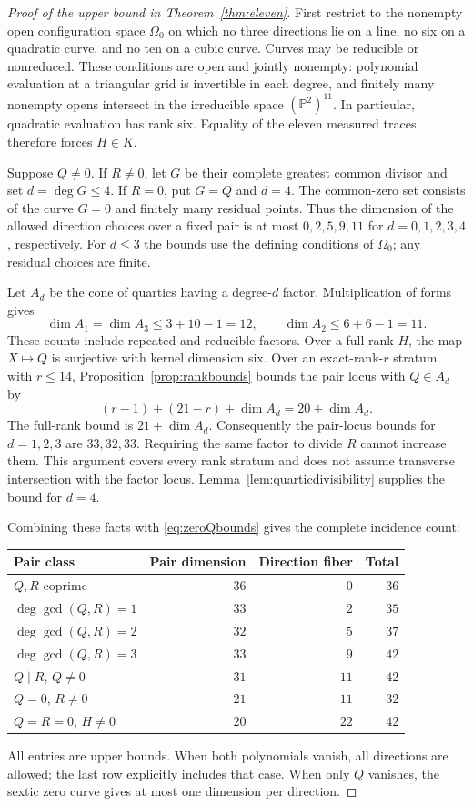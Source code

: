 \documentclass[11pt]{amsart}
\theoremstyle{remark}
\newcommand{\PP}{\mathbb P}
\begin{document}
\begin{proof}[Proof of the upper bound in Theorem~\ref{thm:eleven}]
First restrict to the nonempty open configuration space $\Omega_0$ on which no three directions lie on a line, no six on a quadratic curve, and no ten on a cubic curve. Curves may be reducible or nonreduced. These conditions are open and jointly nonempty: polynomial evaluation at a triangular grid is invertible in each degree, and finitely many nonempty opens intersect in the irreducible space $(\PP^2)^{11}$. In particular, quadratic evaluation has rank six. Equality of the eleven measured traces therefore forces $H\in K$.

Suppose $Q\ne0$. If $R\ne0$, let $G$ be their complete greatest common divisor and set $d=\deg G\leq4$. If $R=0$, put $G=Q$ and $d=4$. The common-zero set consists of the curve $G=0$ and finitely many residual points. Thus the dimension of the allowed direction choices over a fixed pair is at most $0,2,5,9,11$ for $d=0,1,2,3,4$, respectively. For $d\leq3$ the bounds use the defining conditions of $\Omega_0$; any residual choices are finite.

Let $A_d$ be the cone of quartics having a degree-$d$ factor. Multiplication of forms gives
\[
 \dim A_1=\dim A_3\leq3+10-1=12,
 \qquad \dim A_2\leq6+6-1=11.
\]
These counts include repeated and reducible factors. Over a full-rank $H$, the map $X\mapsto Q$ is surjective with kernel dimension six. Over an exact-rank-$r$ stratum with $r\leq14$, Proposition~\ref{prop:rankbounds} bounds the pair locus with $Q\in A_d$ by
\[
 (r-1)+(21-r)+\dim A_d=20+\dim A_d.
\]
The full-rank bound is $21+\dim A_d$. Consequently the pair-locus bounds for $d=1,2,3$ are $33,32,33$. Requiring the same factor to divide $R$ cannot increase them. This argument covers every rank stratum and does not assume transverse intersection with the factor locus. Lemma~\ref{lem:quarticdivisibility} supplies the bound for $d=4$.

Combining these facts with \eqref{eq:zeroQbounds} gives the complete incidence count:
\begin{center}
\begin{tabular}{lrrr}
\toprule
Pair class & Pair dimension & Direction fiber & Total\\
\midrule
$Q,R$ coprime & $36$ & $0$ & $36$\\
$\deg\gcd(Q,R)=1$ & $33$ & $2$ & $35$\\
$\deg\gcd(Q,R)=2$ & $32$ & $5$ & $37$\\
$\deg\gcd(Q,R)=3$ & $33$ & $9$ & $42$\\
$Q\mid R$, $Q\ne0$ & $31$ & $11$ & $42$\\
$Q=0$, $R\ne0$ & $21$ & $11$ & $32$\\
$Q=R=0$, $H\ne0$ & $20$ & $22$ & $42$\\
\bottomrule
\end{tabular}
\end{center}
All entries are upper bounds. When both polynomials vanish, all directions are allowed; the last row explicitly includes that case. When only $Q$ vanishes, the sextic zero curve gives at most one dimension per direction.


\end{proof}
\end{document}
